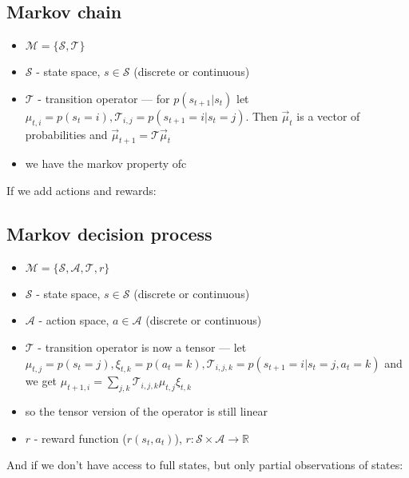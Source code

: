\documentclass{report}
\begin{document}
\subsection{Markov chain}
\begin{itemize}
\item $\mathcal{M} = \{\mathcal{S}, \mathcal{T}\}$
\item $\mathcal{S}$ - state space, $s \in \mathcal{S}$ (discrete or continuous)
\item $\mathcal{T}$ - transition operator --- for  $p(s_{t+1} | s_t)$ let 
		$\mu_{t,i} = p(s_t =i), \mathcal{T}_{i,j} = p(s_{t+1} = i  | s_t = j)$. 
		Then $\overrightarrow{\mu}_t$ is a vector of probabilities and 
		$\overrightarrow{\mu}_{t+1} = \mathcal{T} \overrightarrow{\mu}_t$
\item we have the markov property ofc
\end{itemize}
If we add actions and rewards:
\subsection{Markov decision process}
\begin{itemize}
		\item $\mathcal{M} = \{\mathcal{S}, \mathcal{A}, \mathcal{T}, r\}$
\item $\mathcal{S}$ - state space, $s \in \mathcal{S}$ (discrete or continuous)
\item $\mathcal{A}$ - action space, $a \in \mathcal{A}$ (discrete or continuous)
\item $\mathcal{T}$ - transition operator is now a tensor ---
		let $\mu_{t,j} = p(s_t = j), \xi_{t,k} = p(a_t = k), \mathcal{T}_{i,j,k} = p(s_{t+1} = i | s_t =j, a_t =k) $
		and we get $\mu_{t+1,i} = \sum_{j,k}^{} \mathcal{T}_{i,j,k} \mu_{t,j} \xi_{t,k}$
\item so the tensor version of the operator is still linear
\item $r$ - reward function ($r(s_t, a_t)$), $r : \mathcal{S} \times \mathcal{A} \to \mathbb{R}$
\end{itemize}
And if we don't have access to full states, but only partial observations of states:
\end{document}
